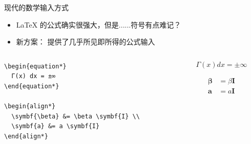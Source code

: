 \begin{frame}[fragile]{现代的数学输入方式}
  \begin{itemize}
    \item \LaTeX{} 的公式确实很强大，但是......符号有点难记？
    \item 新方案： 提供了几乎所见即所得的公式输入
  \end{itemize}
  \pause
  \begin{columns}
    \begin{column}{0.4\textwidth}
      \begin{verbatim}
\begin{equation*}
  Γ(x) dx = ±∞
\end{equation*}

\begin{align*}
  \symbf{\beta} &= \beta \symbf{I} \\
  \symbf{a} &= a \symbf{I}
\end{align*}
      \end{verbatim}
    \end{column}
    \begin{column}{0.4\textwidth}
      \begin{equation*}
        Γ(x) dx = ±∞
      \end{equation*}
      
      \begin{align*}
        \symbf{\beta} &= \beta \symbf{I} \\
        \symbf{a} &= a \symbf{I}
      \end{align*}
    \end{column}
  \end{columns}
\end{frame}
  
